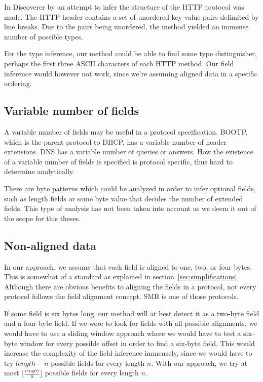 \documentclass[a4paper]{report}
\begin{document}
In Discoverer by \citeauthor{cui07} an attempt to infer the structure of
the HTTP protocol was made. The HTTP header contains a set of unordered
key-value pairs delimited by line breaks. Due to the pairs being unordered,
the method yielded an immense number of possible types.

For the type inference, our method could be able to find some type 
distinguisher, perhaps the first three ASCII characters of each HTTP method.
Our field inference would however not work, since we're assuming aligned
data in a specific ordering.

\subsection{Variable number of fields}
A variable number of fields may be useful in a protocol specification. BOOTP,
which is the parent protocol to DHCP, has a variable number of header 
extensions. DNS has a variable number of queries or answers. How the existence
of a variable number of fields is specified is protocol specific, thus hard to
determine analytically.

There are byte patterns which could be analyzed in order to infer optional
fields, such as length fields or some byte value that decides the number of
extended fields. This type of analysis has not been taken into account as we
deem it out of the scope for this theses.

\subsection{Non-aligned data}
In our approach, we assume that each field is aligned to one, two, or four
bytes. This is somewhat of a standard as explained in
section~\ref{sec:simplifications}. Although there are obvious benefits to
aligning the fields in a protocol, not every protocol follows the field
alignment concept. SMB is one of those protocols.

If some field is six bytes long, our method will at best detect it as a
two-byte field and a four-byte field. If we were to look for fields with
all possible alignments, we would have to use a sliding window approach where
we would have to test a six-byte window for every possible offset in order
to find a six-byte field. This would increase the complexity of the field
inference immensely, since we would have to try $length - n$ possible fields
for every length $n$. With our approach, we try at most
$\lfloor \frac{length}{n} \rfloor$ possible fields for every length $n$.
\end{document}
